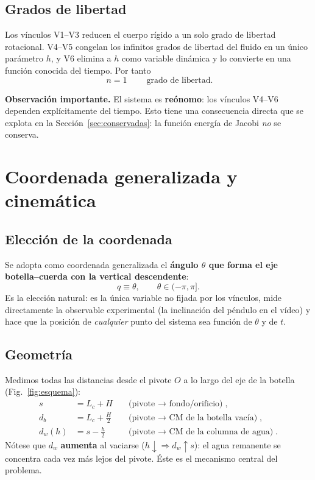 \documentclass[11pt,a4paper]{article}
\begin{document}
\subsection{Grados de libertad}

Los vínculos V1--V3 reducen el cuerpo rígido a un solo grado de libertad rotacional. V4--V5
congelan los infinitos grados de libertad del fluido en un único parámetro $h$, y V6 elimina a $h$
como variable dinámica y lo convierte en una función conocida del tiempo. Por tanto
\begin{equation}
\boxed{\;n = 1\;}\qquad\text{grado de libertad.}
\end{equation}

\textbf{Observación importante.} El sistema es \textbf{reónomo}: los vínculos V4--V6 dependen
explícitamente del tiempo. Esto tiene una consecuencia directa que se explota en la
Sección~\ref{sec:conservadas}: la función energía de Jacobi \emph{no} se conserva.

\section{Coordenada generalizada y cinemática}

\subsection{Elección de la coordenada}

Se adopta como coordenada generalizada el \textbf{ángulo $\theta$ que forma el eje botella--cuerda
con la vertical descendente}:
\begin{equation}
q \equiv \theta, \qquad \theta \in (-\pi,\pi].
\end{equation}
Es la elección natural: es la única variable no fijada por los vínculos, mide directamente la
observable experimental (la inclinación del péndulo en el vídeo) y hace que la posición de
\emph{cualquier} punto del sistema sea función de $\theta$ y de $t$.

\subsection{Geometría}

Medimos todas las distancias desde el pivote $O$ a lo largo del eje de la botella
(Fig.~\ref{fig:esquema}):
\begin{align}
s &= L_c + H && \text{(pivote $\to$ fondo/orificio)},\\
d_b &= L_c + \tfrac{H}{2} && \text{(pivote $\to$ CM de la botella vacía)},\\
d_w(h) &= s - \tfrac{h}{2} && \text{(pivote $\to$ CM de la columna de agua)}.
\end{align}
Nótese que $d_w$ \textbf{aumenta} al vaciarse ($h\downarrow \Rightarrow d_w \uparrow s$): el agua
remanente se concentra cada vez más lejos del pivote. Éste es el mecanismo central del problema.
\end{document}
